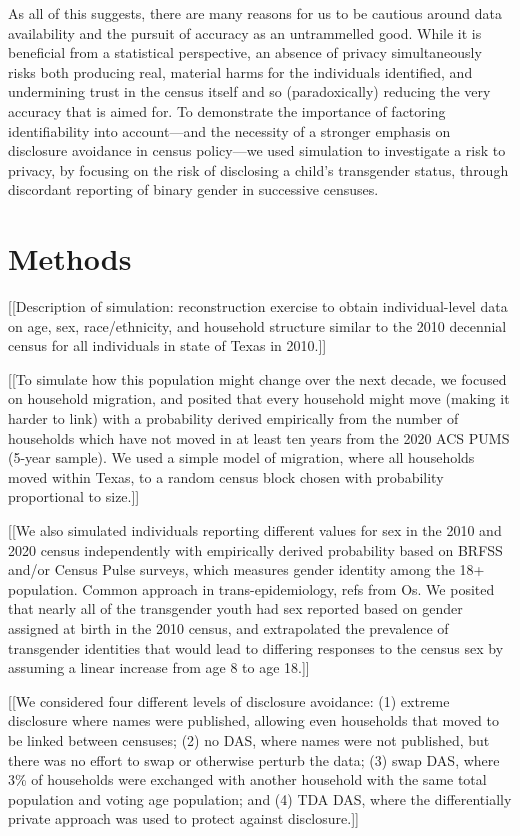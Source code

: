 \documentclass{jpc} %
\theoremstyle{plain}\newtheorem{satz}[thm]{Satz} %
\begin{document}
As all of this suggests, there are many reasons for us to be cautious around data availability and the pursuit of accuracy as an untrammelled good. While it is beneficial from a statistical perspective, an absence of privacy simultaneously risks both producing real, material harms for the individuals identified, and undermining trust in the census itself and so (paradoxically) reducing the very accuracy that is aimed for. To demonstrate the importance of factoring identifiability into account---and the necessity of a stronger emphasis on disclosure avoidance in census policy---we used simulation to investigate a risk to privacy, by focusing on the risk of disclosing a child's transgender status, through discordant reporting of binary gender in successive censuses.

\section*{Methods}

[[Description of simulation: reconstruction exercise to obtain individual-level data on age, sex, race/ethnicity, and household structure similar to the 2010 decennial census for all individuals in state of Texas in 2010.]]

[[To simulate how this population might change over the next decade, we focused on household migration, and posited that every household might move (making it harder to link) with a probability derived empirically from the number of households which have not moved in at least ten years from the 2020 ACS PUMS (5-year sample). We used a simple model of migration, where all households moved within Texas, to a random census block chosen with probability proportional to size.]]

[[We also simulated individuals reporting different values for sex in the 2010 and 2020 census independently with empirically derived probability based on BRFSS and/or Census Pulse surveys, which measures gender identity among the 18+ population. Common approach in trans-epidemiology, refs from Os.  We posited that nearly all of the transgender youth had sex reported based on gender assigned at birth in the 2010 census, and extrapolated the prevalence of transgender identities that would lead to differing responses to the census sex by assuming a linear increase from age 8 to age 18.]]

[[We considered four different levels of disclosure avoidance: (1) extreme disclosure where names were published, allowing even households that moved to be linked between censuses; (2) no DAS, where names were not published, but there was no effort to swap or otherwise perturb the data; (3) swap DAS, where 3\% of households were exchanged with another household with the same total population and voting age population; and (4) TDA DAS, where the differentially private approach was used to protect against disclosure.]]
\end{document}
